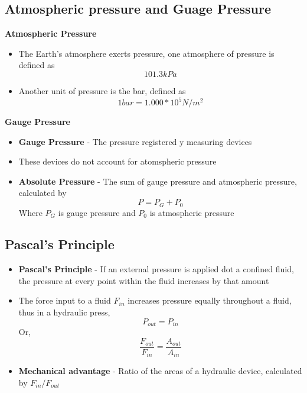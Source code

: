 \subsection{Atmospheric pressure and Guage Pressure}

\textbf{Atmospheric Pressure}
\begin{itemize}
    \item The Earth's atmosphere exerts pressure, one atmosphere of pressure is defined as \[101.3kPa\]
    \item Another unit of pressure is the bar, defined as \[1 bar=1.000*10^5N/m^2\]
\end{itemize}

\textbf{Gauge Pressure}
\begin{itemize}
    \item \textbf{Gauge Pressure} - The pressure registered y measuring devices
    \item These devices do not account for atomspheric pressure
    \item \textbf{Absolute Pressure} - The sum of gauge pressure and atmospheric pressure, calculated by \[P=P_G+P_0\] Where \(P_G\) is gauge pressure and \(P_0\) is atmospheric pressure
\end{itemize}

\subsection{Pascal’s Principle}
\begin{itemize}
    \item \textbf{Pascal's Principle} - If an external pressure is applied dot a confined fluid, the pressure at every point within the fluid increases by that amount
    \item The force input to a fluid \(F_{in}\) increases pressure equally throughout a fluid, thus in a hydraulic press, \[P_{out}=P_{in}\] Or, \[\frac{F_{out}}{F_{in}}=\frac{A_{out}}{A_{in}}\]
    \item \textbf{Mechanical advantage} - Ratio of the areas of a hydraulic device, calculated by \(F_{in}/F_{out}\)
\end{itemize}

